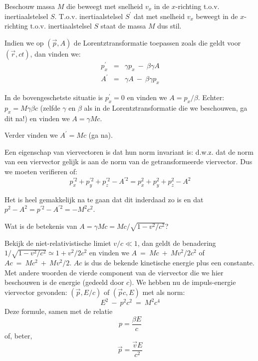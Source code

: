 Beschouw massa $M$ die beweegt met snelheid $v_x$ in de $x$-richting
t.o.v. inertiaalstelsel $S$. T.o.v. inertiaalstelsel $S^\prime$ dat
met snelheid $v_x$ beweegt in de $x$-richting t.o.v. inertiaalstelsel $S$
staat de massa $M$ dus stil.

Indien we op $(\vec{p},A)$ de Lorentztransformatie toepassen zoals die
geldt voor $(\vec{r},ct)$, dan vinden we:
\begin{eqnarray*}
p_x^\prime & = & \gamma p_x~-~\beta \gamma A \\
A^\prime & = & \gamma A~-~\beta \gamma p_x 
\end{eqnarray*}

In de bovengeschetste situatie is $p_x^\prime=0$ en vinden we
$A=p_x/\beta$. Echter: $p_x=M\gamma \beta c$ (zelfde $\gamma$ en
$\beta$ als in de Lorentztransformatie die we beschouwen, ga dit
na!) en vinden we $A=\gamma Mc$.

Verder vinden we $A^\prime=Mc$ (ga na).

Een eigenschap van viervectoren is dat hun norm invariant is:
d.w.z. dat de norm van een viervector gelijk is aan de norm
van de getransformeerde viervector. Dus we moeten verifieren of:
\begin{displaymath}
p_x^{\prime 2}+p_y^{\prime 2}+p_z^{\prime 2}-A^{\prime 2}=p_x^{2}+p_y^{2}+p_z^{2}-A^{2}
\end{displaymath}

Het is heel gemakkelijk na te gaan dat dit inderdaad zo is en dat
$p^2-A^2=p^{\prime 2}-A^{\prime 2}=-M^2c^2$.

Wat is de betekenis van $A=\gamma M c = Mc/\sqrt{1-v^2/c^2}$?

Bekijk de niet-relativistische limiet $v/c \ll 1$, dan geldt de
benadering $1/\sqrt{1-v^2/c^2}\simeq 1+v^2/2c^2$ en vinden we
$A~=~ Mc~+~Mv^2/2c^2$ of $Ac~=~Mc^2~+~Mv^2/2$. $Ac$ is dus
de bekende kinetische energie plus een constante. Met andere
woorden de vierde component van de viervector die we hier beschouwen
is de energie (gedeeld door $c$). We hebben nu de impuls-energie
viervector gevonden: $(\vec{p},E/c)$ of $(\vec{p}c,E)$ met als
norm:
\begin{displaymath}
E^2~-~p^2c^2~=~M^2c^4
\end{displaymath}
Deze formule, samen met de relatie 
\begin{displaymath}
p=\frac{\beta E}{c}
\end{displaymath}
of, beter,
\begin{displaymath}
\vec{p}=\frac{\vec{v} E}{c^2}
\end{displaymath}


